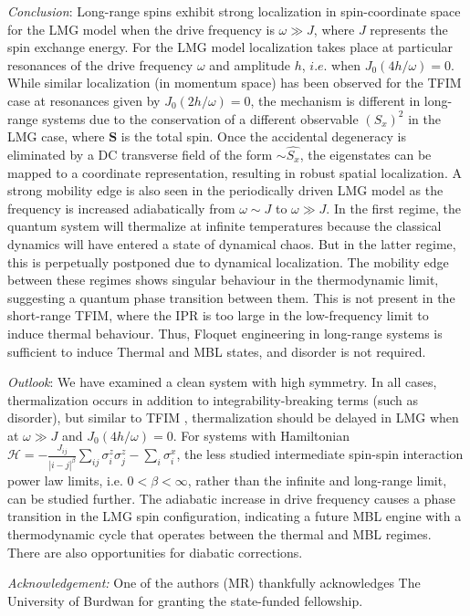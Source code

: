 \documentclass[%
 reprint,
superscriptaddress,
 amsmath,amssymb,
 aps,
prb,
]{revtex4-2}
\begin{document}
 \emph{Conclusion}: Long-range spins exhibit strong localization in spin-coordinate space for the LMG model when the drive frequency is $\omega \gg J$, where $J$ represents the spin exchange energy. For the LMG model localization takes place at particular resonances of the drive frequency $\omega$ and amplitude $h$, $\textit{i.e.}$ when $J_0(4h/\omega)=0$. While similar localization (in momentum space) has been observed for the TFIM case at resonances given by $J_0(2h/\omega)=0$, the mechanism is different in long-range systems due to the conservation of a different observable $(S_x)^2$ in the LMG case, where $\mathbf{S}$ is the total spin. Once the accidental degeneracy is eliminated by a DC transverse field of the form $\sim \hat{S_x}$, the eigenstates can be mapped to a coordinate representation, resulting in robust spatial localization. A strong mobility edge is also seen in the periodically driven LMG model as the frequency is increased adiabatically from $\omega \sim J$ to $\omega \gg J$.
 In the first regime, the quantum system will thermalize at infinite temperatures because the classical dynamics will have entered a state of dynamical chaos.
 But in the latter regime, this is perpetually postponed due to dynamical localization. The mobility edge between these regimes shows singular behaviour in the thermodynamic limit, suggesting a quantum phase transition between them. This is not present in the short-range TFIM, where the IPR is too large in the low-frequency limit to induce thermal behaviour. Thus, Floquet engineering in long-range systems is sufficient to induce Thermal and MBL states, and disorder is not required.
 
 \emph{Outlook}: 
We have examined a clean system with high symmetry. In all cases, thermalization occurs in addition to integrability-breaking terms (such as disorder), but similar to TFIM \cite{haugland_changing_2021}, thermalization should be delayed in LMG when at $\omega\gg J$ and $J_0(4h/\omega) = 0$. For systems with Hamiltonian $\mathcal{H} = -\frac{J_{ij}}{|i-j|^\beta} \sum_{ij}\sigma^z_i\sigma^z_j -\sum_i \sigma^x_i$, the less studied intermediate spin-spin interaction power law limits, i.e. $0<\beta<\infty$, rather than the infinite and long-range limit, can be studied further. The adiabatic increase in drive frequency causes a phase transition in the LMG spin configuration, indicating a future MBL engine with a thermodynamic cycle that operates between the thermal and MBL regimes. There are also opportunities for diabatic corrections. 

 
 
{\it Acknowledgement:}
 One of the authors (MR) thankfully acknowledges The University of Burdwan for granting the state-funded fellowship.



\nocite{*}

\end{document}
